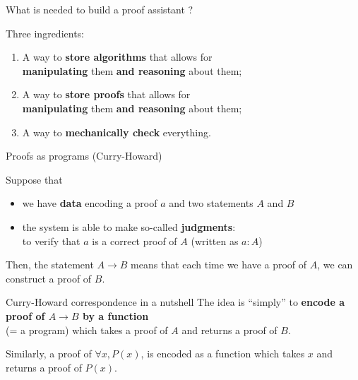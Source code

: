 \documentclass[compress,11pt]{beamer}
\newcommand{\red}[1]{{\color{red} #1}}
\begin{document}
\begin{frame}{What is needed to build a proof assistant ?}

Three ingredients:
\begin{enumerate}
\item A way to \textbf{\red{store algorithms}} that allows for\\
  \textbf{manipulating} them \textbf{and reasoning} about them;
\bigskip\pause

\item A way to \textbf{\red{store proofs}} that allows for\\
  \textbf{manipulating} them \textbf{and reasoning} about them;
\bigskip\pause

\item A way to \textbf{mechanically check} everything.
\end{enumerate}
\end{frame}

\begin{frame}{Proofs as programs (Curry-Howard)}

Suppose that
\begin{itemize}
\item we have \textbf{data} encoding a proof $a$ and two statements $A$ and
  $B$
\item the system is able to make so-called \textbf{judgments}: \\
  to verify that $a$ is a correct proof of $A$ (written as $a : A$)
\end{itemize}
\pause\medskip

Then, the statement $A \to B$ means that each time we have a proof of $A$, we
can construct a proof of $B$.
\pause\bigskip

\begin{block}{Curry-Howard correspondence in a nutshell}
  The idea is ``simply'' to \textbf{encode a proof of $A \to B$ by a function}\\
  (= a program) which takes a proof of $A$ and returns a proof of $B$.
  \bigskip\pause

  Similarly, a proof of $\forall x, P(x)$, is encoded as a function which
  takes $x$ and returns a proof of $P(x)$.
\end{block}


\end{frame}
\end{document}
